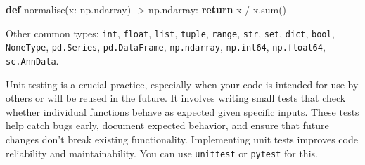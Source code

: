 \documentclass[
  letterpaper,
  DIV=11,
  numbers=noendperiod]{scrartcl}
\newenvironment{Shaded}{\begin{snugshade}}{\end{snugshade}}
\newcommand{\BuiltInTok}[1]{\textcolor[rgb]{0.00,0.23,0.31}{#1}}
\newcommand{\ControlFlowTok}[1]{\textcolor[rgb]{0.00,0.23,0.31}{\textbf{#1}}}
\newcommand{\KeywordTok}[1]{\textcolor[rgb]{0.00,0.23,0.31}{\textbf{#1}}}
\newcommand{\NormalTok}[1]{\textcolor[rgb]{0.00,0.23,0.31}{#1}}
\newcommand{\OperatorTok}[1]{\textcolor[rgb]{0.37,0.37,0.37}{#1}}
\begin{document}
\begin{Shaded}
\begin{Highlighting}[]
\KeywordTok{def}\NormalTok{ normalise(x: np.ndarray) }\OperatorTok{{-}\textgreater{}}\NormalTok{ np.ndarray:}
    \ControlFlowTok{return}\NormalTok{ x }\OperatorTok{/}\NormalTok{ x.}\BuiltInTok{sum}\NormalTok{()}
\end{Highlighting}
\end{Shaded}

Other common types: \texttt{int}, \texttt{float}, \texttt{list},
\texttt{tuple}, \texttt{range}, \texttt{str}, \texttt{set},
\texttt{dict}, \texttt{bool}, \texttt{NoneType}, \texttt{pd.Series},
\texttt{pd.DataFrame}, \texttt{np.ndarray}, \texttt{np.int64},
\texttt{np.float64}, \texttt{sc.AnnData}.

Unit testing is a crucial practice, especially when your code is
intended for use by others or will be reused in the future. It involves
writing small tests that check whether individual functions behave as
expected given specific inputs. These tests help catch bugs early,
document expected behavior, and ensure that future changes don't break
existing functionality. Implementing unit tests improves code
reliability and maintainability. You can use \texttt{unittest} or
\texttt{pytest} for this.
\end{document}
